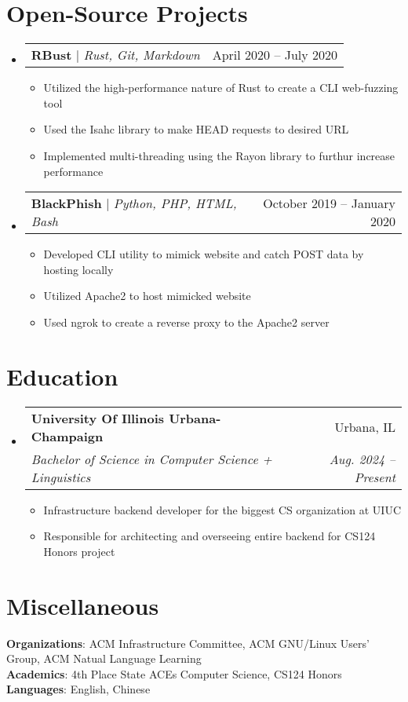 \documentclass[letterpaper,11pt]{article}
\makeatletter
\newcommand{\resumeItem}[1]{
  \item\small{
    {#1 \vspace{-2pt}}
  }
}
\newcommand{\resumeSubheading}[4]{
  \vspace{-2pt}\item
    \begin{tabular*}{0.97\textwidth}[t]{l@{\extracolsep{\fill}}r}
      \textbf{#1} & #2 \\
      \textit{\small#3} & \textit{\small #4} \\
    \end{tabular*}\vspace{-7pt}
}
\newcommand{\resumeProjectHeading}[2]{
    \item
    \begin{tabular*}{0.97\textwidth}{l@{\extracolsep{\fill}}r}
      \small#1 & #2 \\
    \end{tabular*}\vspace{-7pt}
}
\newcommand{\resumeSubHeadingListStart}{\begin{itemize}[leftmargin=0.15in, label={}]}
\newcommand{\resumeSubHeadingListEnd}{\end{itemize}}
\newcommand{\resumeItemListStart}{\begin{itemize}}
\newcommand{\resumeItemListEnd}{\end{itemize}\vspace{-5pt}}
\makeatother
\begin{document}
\section{Open-Source Projects}
    \resumeSubHeadingListStart
      \resumeProjectHeading
          {\textbf{RBust} $|$ \emph{Rust, Git, Markdown}}{April 2020 -- July 2020}
          \resumeItemListStart
            \resumeItem{Utilized the high-performance nature of Rust to create a CLI web-fuzzing tool}
            \resumeItem{Used the Isahc library to make HEAD requests to desired URL}
            \resumeItem{Implemented multi-threading using the Rayon library to furthur increase performance}
          \resumeItemListEnd
      \resumeProjectHeading
          {\textbf{BlackPhish} $|$ \emph{Python, PHP, HTML, Bash}}{October 2019 -- January 2020}
          \resumeItemListStart
            \resumeItem{Developed CLI utility to mimick website and catch POST data by hosting locally}
            \resumeItem{Utilized Apache2 to host mimicked website}
            \resumeItem{Used ngrok to create a reverse proxy to the Apache2 server}
          \resumeItemListEnd
    \resumeSubHeadingListEnd

\section{Education}
  \resumeSubHeadingListStart
    \resumeSubheading
      {University Of Illinois Urbana-Champaign}{Urbana, IL}
      {Bachelor of Science in Computer Science + Linguistics}{Aug. 2024 -- Present}
      \resumeItemListStart
        \resumeItem{Infrastructure backend developer for the biggest CS organization at UIUC}
        \resumeItem{Responsible for architecting and overseeing entire backend for CS124 Honors project}
      \resumeItemListEnd
        
  \resumeSubHeadingListEnd

\section{Miscellaneous}
 \begin{itemize}[leftmargin=0.15in, label={}]
    \small{\item{
     \textbf{Organizations}{: ACM Infrastructure Committee, ACM GNU/Linux Users' Group, ACM Natual Language Learning} \\
     \textbf{Academics}{: 4th Place State ACEs Computer Science, CS124 Honors} \\
     \textbf{Languages}{: English, Chinese} \\
    }}
 \end{itemize}

\end{document}
